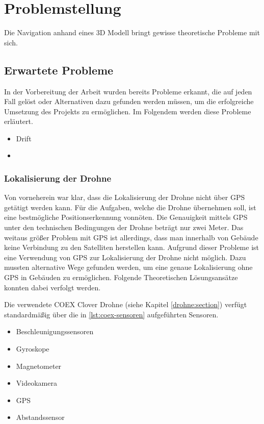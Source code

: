 \chapter{Problemstellung}

Die Navigation anhand eines 3D Modell bringt gewisse theoretische Probleme mit sich.





\section{Erwartete Probleme} \label{erwartete_probleme:section}

In der Vorbereitung der Arbeit wurden bereits Probleme erkannt, die auf jeden Fall gelöst oder Alternativen dazu gefunden werden müssen, um die erfolgreiche Umsetzung des Projekts zu ermöglichen. Im Folgendem werden diese Probleme erläutert.

\begin{itemize}
    \item{Drift}
    \item 
\end{itemize}

\subsection{Lokalisierung der Drohne} \label{lokalisierung_der_drohne:subsection}

Von vorneherein war klar, dass die Lokalisierung der Drohne nicht über \ac{GPS} getätigt werden kann. Für die Aufgaben, welche die Drohne übernehmen soll, ist eine bestmögliche Positionserkennung vonnöten. Die Genauigkeit mittels \ac{GPS} unter den technischen Bedingungen der Drohne beträgt nur zwei Meter. Das weitaus größer Problem mit \ac{GPS} ist allerdings, dass man innerhalb von Gebäude keine Verbindung zu den Satelliten herstellen kann. Aufgrund dieser Probleme ist eine Verwendung von \ac{GPS} zur Lokalisierung der Drohne nicht möglich. Dazu mussten alternative Wege gefunden werden, um eine genaue Lokalisierung ohne \ac{GPS} in Gebäuden zu ermöglichen. Folgende Theoretischen Lösungsansätze konnten dabei verfolgt werden.

Die verwendete COEX Clover Drohne (siehe Kapitel \ref{drohne:section}) verfügt standardmäßig über die in \ref{lst:coex-sensoren} aufgeführten Sensoren.

\begin{center}
\begin{itemize}
    \item Beschleunigungssensoren 
    \item Gyroskope
    \item Magnetometer
    \item Videokamera
    \item GPS
    \item Abstandssensor
\end{itemize}
\label{lst:coex-sensoren}
\end{center}

